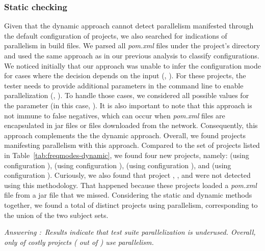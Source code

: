 \subsubsection{Static checking}
\label{sec:rqC-2}
Given that the dynamic approach cannot detect parallelism manifested
through the default
configuration of projects, we also searched for indications of parallelism in build
files.  We
parsed all \emph{pom.xml} files under the project's directory and used
the same approach as in our previous analysis to classify
configurations.  We noticed initially that our approach was unable to
infer the configuration mode for cases where the decision depends on
the input (\eg,
). For these
projects, the tester needs to provide additional parameters in the
command line to enable parallelization (\eg, ). To handle those cases, we
considered all possible values for the parameter (in this case,
).  It is also important to note that this
approach is not immune to false negatives, which can occur when
\emph{pom.xml} files are encapsulated in jar files or files downloaded from
the network.  Consequently, this approach complements the
the dynamic approach. Overall, we found \numProjectsParStatic{}
projects manifesting parallelism with this approach.
Compared to the set of projects listed in
Table~\ref{tab:freqmodes-dynamic}, we found four new projects, namely:
 (using
configuration \ParClassParMeth),  (using configuration
\ForkSeq{}),  (using configuration \ForkSeq), and
 (using configuration \ParClassParMeth).
Curiously, we also found that project , ,
and  were not detected using this methodology.
That happened because these projects loaded a \emph{pom.xml} file from
a jar file that we missed.
Considering the static and dynamic methods together, we found a total
of \numProjectsParTotal{} distinct projects using parallelism,
corresponding to the union of the two subject sets.

\begin{mdframed}
  \noindent\textit{Answering \numRQAdoptionOne{}:}~\emph{Results indicate that test
  suite parallelization is underused.  Overall, only
  \percentParallel{} of costly projects (\numProjectsParTotal{} out of \numMedLong)
  use parallelism.}
\end{mdframed}

